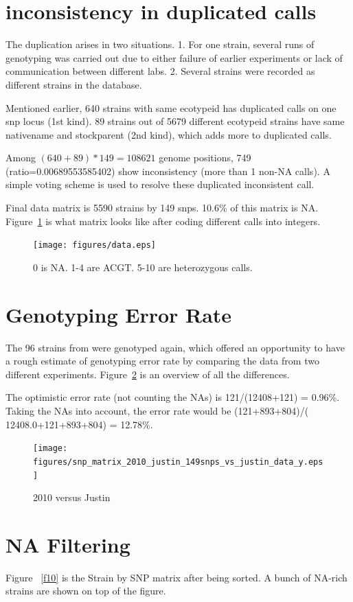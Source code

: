 \documentclass[a4paper,10pt]{article}
\begin{document}
\section{inconsistency in duplicated calls}
The duplication arises in two situations. 1. For one strain, several runs of genotyping was carried out due to either failure of earlier experiments or lack of communication between different labs. 2. Several strains were recorded as different strains in the database.

Mentioned earlier, 640 strains with same ecotypeid has duplicated calls on one snp locus (1st kind). 89 strains out of 5679 different ecotypeid strains have same nativename and stockparent (2nd kind), which adds more to duplicated calls.

Among $(640+89)*149=108621$ genome positions, 749 (ratio=0.00689553585402) show inconsistency (more than 1 non-NA calls). A simple voting scheme is used to resolve these duplicated inconsistent call.

Final data matrix is 5590 strains by 149 snps. 10.6\% of this matrix is NA. Figure~\ref{f24} is what matrix looks like after coding different calls into integers.

\begin{figure}
\texttt{[image: figures/data.eps]}
\caption{0 is NA. 1-4 are ACGT. 5-10 are heterozygous calls.}\label{f24}
\end{figure}

\section{Genotyping Error Rate}
The 96 strains from \cite{Nordborg2005} were genotyped again, which offered an opportunity to have a rough estimate of genotyping error rate by comparing the data from two different experiments. Figure~\ref{f0} is an overview of all the differences.

The optimistic error rate (not counting the NAs) is 121/(12408+121) = 0.96\%. Taking the NAs into account, the error rate would be (121+893+804)/( 12408.0+121+893+804) = 12.78\%.

\begin{figure}
\texttt{[image: figures/snp\_matrix\_2010\_justin\_149snps\_vs\_justin\_data\_y.eps]}
\caption{2010 versus Justin}\label{f0}
\end{figure}


\section{NA Filtering}
Figure ~\ref{f10} is the Strain by SNP matrix after being sorted. A bunch of NA-rich strains are shown on top of the figure.
\end{document}
